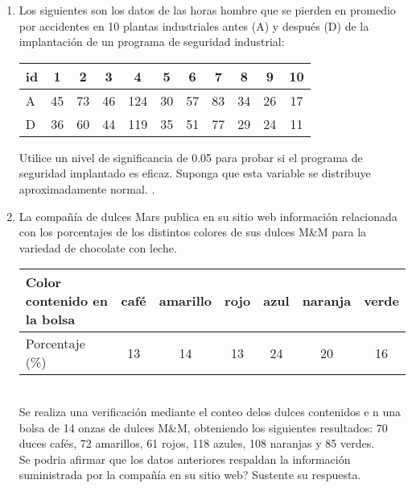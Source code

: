 \documentclass[base=hide,9pt]{elegantbook}
\begin{document}
\begin{enumerate}
	\item Los siguientes son los datos de las horas hombre que se pierden en promedio por accidentes en 10 plantas industriales antes (A) y después (D) de la implantación de un programa de seguridad industrial:\\
	
	\begin{tabular}{l|cccccccccc}
		id & 1 &  2 & 3  & 4  &  5  & 6  & 7  & 8  & 9  & 10\\ \hline 
		A  & 45 & 73 & 46 & 124 & 30 & 57 & 83 & 34 & 26 & 17 \\  \hline 
		D  & 36 & 60 & 44 & 119 & 35 & 51 & 77 & 29 & 24 & 11 \\   
	\end{tabular}
	
	\vspace{.5cm}
	Utilice un nivel de significancia de 0.05 para probar si el programa de seguridad implantado es eficaz. Suponga que esta variable se distribuye aproximadamente normal.
	\vspace{.5cm}
	.
	\vspace{1cm}
	\item La compañía de dulces Mars publica en su sitio web información relacionada con los porcentajes de los distintos colores de sus dulces M\&M para la variedad de chocolate con leche.\\
	
	\begin{tabular}{l|cccccc}
		Color contenido en la bolsa & café & amarillo & rojo & azul & naranja & verde \\
		\hline 
		Porcentaje (\%)             & 13 & 14 & 13 & 24 & 20 & 16 \\
	\end{tabular}
	\\
	
	Se realiza una verificación mediante el conteo delos dulces contenidos e n una bolsa de 14 onzas de dulces M\&M, obteniendo los siguientes resultados: 70 duces cafés, 72 amarillos, 61 rojos, 118 azules, 108 naranjas y 85 verdes. \\
	
	Se podria afirmar que los datos anteriores respaldan la información suministrada por la compañía en su sitio web? Sustente su respuesta.
	

\end{enumerate}
\end{document}
